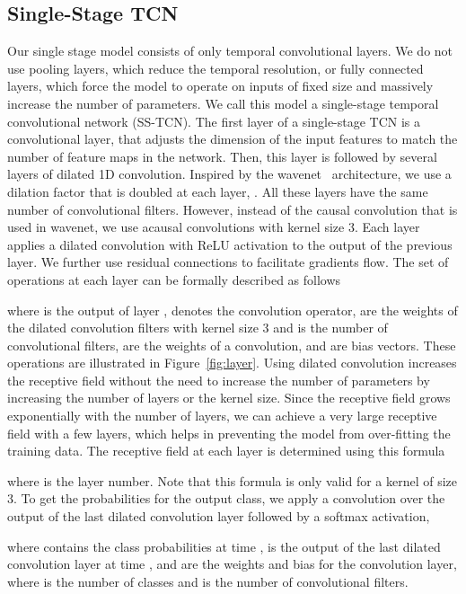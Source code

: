 \documentclass[10pt,twocolumn,letterpaper]{article}
\begin{document}
\subsection{Single-Stage TCN}
\label{sec:single_stage_model}
Our single stage model consists of only temporal convolutional layers. 
We do not use pooling layers, which reduce the temporal resolution, or 
fully connected layers, which force the model to operate on inputs of 
fixed size and massively increase the number of parameters. We call this 
model a single-stage temporal convolutional network (SS-TCN).
The first layer of a single-stage TCN is a  convolutional layer, 
that adjusts the dimension of the input features to match the number 
of feature maps in the network. Then, this layer is followed by several 
layers of dilated 1D convolution. Inspired by the wavenet~\cite{van2016wavenet} 
architecture, we use a dilation factor that is doubled at each layer, 
\ie . All these layers have the same number of 
convolutional filters. However, instead of the causal convolution that 
is used in wavenet, we use acausal convolutions with kernel size 3. 
Each layer applies a dilated convolution with ReLU activation to the output 
of the previous layer. We further use residual connections to facilitate 
gradients flow. The set of operations at each layer can be formally 
described as follows
 
where  is the output of layer ,  denotes the convolution operator, 
 are the weights of the dilated convolution 
filters with kernel size 3 and  is the number of convolutional filters, 
 are the weights of a  convolution, 
and  are bias vectors. These operations are illustrated in 
Figure~\ref{fig:layer}. Using dilated convolution increases the receptive field 
without the need to increase the number of parameters by increasing the number 
of layers or the kernel size. Since the receptive field grows exponentially with 
the number of layers, we can achieve a very large receptive field with a few layers, 
which helps in preventing the model from over-fitting the training data. The receptive 
field at each layer is determined using this formula 

where  is the layer number. Note that this formula is only 
valid for a kernel of size 3. To get the probabilities for the output class, we apply a 
 convolution over the output of the last dilated convolution layer followed 
by a softmax activation, \ie

where  contains the class probabilities at time ,  is the output 
of the last dilated convolution layer at time ,  and 
 are the weights and bias for the  convolution layer, 
where  is the number of classes and  is the number of convolutional filters.
   
\end{document}
